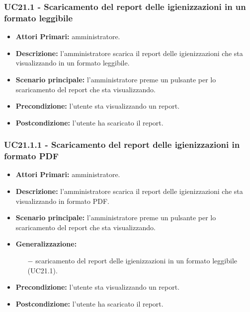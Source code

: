 \subsubsection{ UC21.1 - Scaricamento del report delle igienizzazioni in un formato leggibile}
\begin{itemize}
	\item\textbf{Attori Primari:} 
	amministratore.
	\item\textbf{Descrizione:} 
	l'amministratore scarica il report delle igienizzazioni che sta visualizzando in un formato leggibile.
	\item\textbf{Scenario principale:} 
	l'amministratore preme un pulsante per lo scaricamento del report che sta visualizzando.
	\item\textbf{Precondizione:} 
	l'utente sta visualizzando un report.
	\item\textbf{Postcondizione:}
	l'utente ha scaricato il report.
\end{itemize}

\subsubsection{ UC21.1.1 - Scaricamento del report delle igienizzazioni in formato PDF}
\begin{itemize}
	\item\textbf{Attori Primari:} 
	amministratore.
	\item\textbf{Descrizione:} 
	l'amministratore scarica il report delle igienizzazioni che sta visualizzando in formato PDF.
	\item\textbf{Scenario principale:} 
	l'amministratore preme un pulsante per lo scaricamento del report che sta visualizzando.
	\item\textbf{Generalizzazione:}
	\begin{itemize}
		\item[$-$] scaricamento del report delle igienizzazioni in un formato leggibile (UC21.1).
	\end{itemize}
	\item\textbf{Precondizione:} 
	l'utente sta visualizzando un report.
	\item\textbf{Postcondizione:}
	l'utente ha scaricato il report.
\end{itemize}








